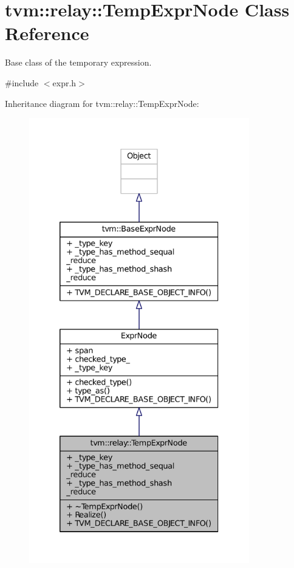 \hypertarget{classtvm_1_1relay_1_1TempExprNode}{}\section{tvm\+:\+:relay\+:\+:Temp\+Expr\+Node Class Reference}
\label{classtvm_1_1relay_1_1TempExprNode}


Base class of the temporary expression.  




{\ttfamily \#include $<$expr.\+h$>$}



Inheritance diagram for tvm\+:\+:relay\+:\+:Temp\+Expr\+Node\+:
\nopagebreak
\begin{figure}[H]
\begin{center}
\leavevmode
\includegraphics[height=550pt]{classtvm_1_1relay_1_1TempExprNode__inherit__graph}
\end{center}
\end{figure}


